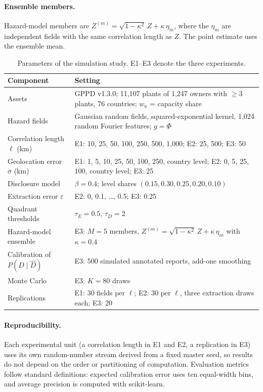 \documentclass{article}
\theoremstyle{plain}
\theoremstyle{definition}
\begin{document}
\paragraph{Ensemble members.} Hazard-model members are $Z^{(m)} = \sqrt{1-\kappa^2}\,Z + \kappa\,\eta_m$, where the $\eta_m$ are independent fields with the same correlation length as $Z$. The point estimate uses the ensemble mean.

\begin{table}[h]
\caption{Parameters of the simulation study. E1--E3 denote the three experiments.}
\label{tab:params}
\centering
\small
\begin{tabularx}{\textwidth}{@{}l>{\raggedright\arraybackslash}X@{}}
\toprule
Component & Setting \\
\midrule
Assets & GPPD v1.3.0; 11,107 plants of 1,247 owners with $\geq 3$ plants, 76 countries; $w_a$ = capacity share \\
Hazard fields & Gaussian random fields, squared-exponential kernel, 1,024 random Fourier features; $g = \Phi$ \\
Correlation length $\ell$ (km) & E1: 10, 25, 50, 100, 250, 500, 1,000; \; E2: 25, 500; \; E3: 50 \\
Geolocation error $\sigma$ (km) & E1: 1, 5, 10, 25, 50, 100, 250, country level; \; E2: 0, 5, 25, 100, country level; \; E3: 25 \\
Disclosure model & $\beta = 0.4$; level shares $(0.15, 0.30, 0.25, 0.20, 0.10)$ \\
Extraction error $\varepsilon$ & E2: 0, 0.1, \ldots, 0.5; \; E3: 0.25 \\
Quadrant thresholds & $\tau_E = 0.5$, $\tau_D = 2$ \\
Hazard-model ensemble & E3: $M = 5$ members, $Z^{(m)} = \sqrt{1-\kappa^2}\,Z + \kappa\,\eta_m$ with $\kappa = 0.4$ \\
Calibration of $P(D\mid\hat D)$ & E3: 500 simulated annotated reports, add-one smoothing \\
Monte Carlo & E3: $K = 80$ draws \\
Replications & E1: 30 fields per $\ell$; \; E2: 30 per $\ell$, three extraction draws each; \; E3: 20 \\
\bottomrule
\end{tabularx}
\end{table}

\paragraph{Reproducibility.} Each experimental unit (a correlation length in E1 and E2, a replication in E3) uses its own random-number stream derived from a fixed master seed, so results do not depend on the order or partitioning of computation. Evaluation metrics follow standard definitions: expected calibration error uses ten equal-width bins, and average precision is computed with scikit-learn.
\end{document}

